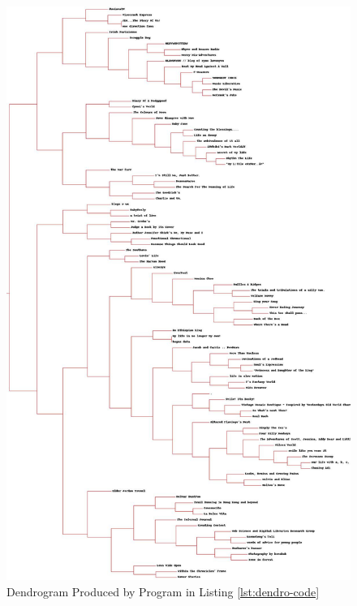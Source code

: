 \begin{figure}[ht]    
    \begin{center}
        \includegraphics[scale=0.26]{questions/q2/blogclust.jpg}
        \caption{Dendrogram Produced by Program in Listing \ref{lst:dendro-code}}
        \label{Dendrogram}
    \end{center}
\end{figure}

\newpage
